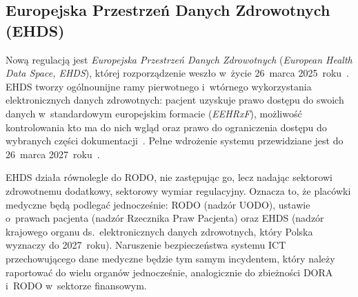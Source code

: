 \subsection*{Europejska Przestrzeń Danych Zdrowotnych (EHDS)}

Nową regulacją jest \textit{Europejska Przestrzeń Danych Zdrowotnych} (\textit{European Health Data Space, EHDS}), której rozporządzenie weszło w~życie 26~marca 2025~roku~\autocite{ehds_gov_zdrowie}. EHDS tworzy
ogólnounijne ramy pierwotnego i~wtórnego wykorzystania elektronicznych danych zdrowotnych: pacjent uzyskuje prawo dostępu do swoich danych w~standardowym europejskim formacie (\textit{EEHRxF}), możliwość kontrolowania kto ma do nich wgląd oraz prawo do ograniczenia dostępu do wybranych części dokumentacji~\autocite{ehds_komisja}.
Pełne wdrożenie systemu  przewidziane jest do 26~marca 2027~roku~\autocite{ehds_gov_zdrowie}.

EHDS działa równolegle do RODO, nie zastępując go, lecz nadając sektorowi zdrowotnemu dodatkowy, sektorowy wymiar regulacyjny. Oznacza to, że placówki medyczne będą podlegać jednocześnie: RODO (nadzór UODO), ustawie o~prawach pacjenta (nadzór Rzecznika Praw Pacjenta) oraz EHDS (nadzór krajowego organu ds.\ elektronicznych danych zdrowotnych, który Polska wyznaczy do 2027~roku).
Naruszenie bezpieczeństwa systemu ICT przechowującego dane medyczne będzie tym samym incydentem, który należy raportować do wielu organów jednocześnie, analogicznie do zbieżności DORA i~RODO w~sektorze finansowym.

